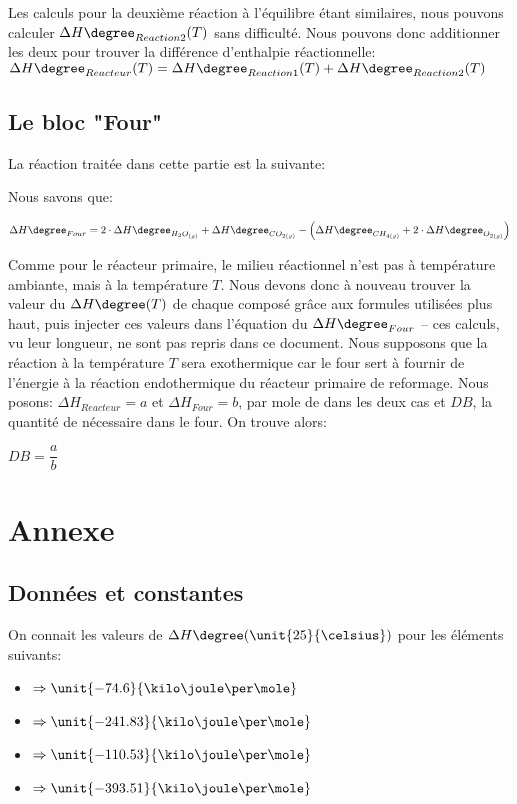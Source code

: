 \documentclass[11pt,a4paper]{report}
\begin{document}
Les calculs pour la deuxième réaction à l'équilibre étant similaires, nous pouvons
calculer $\Delta H\degree_{Reaction2}(T)$ sans difficulté. Nous pouvons donc additionner les deux pour trouver
la différence d'enthalpie réactionnelle: $\Delta H\degree_{Reacteur}(T)=\Delta H\degree_{Reaction1}(T)+\Delta H\degree_{Reaction2}(T)$

\subsection*{Le bloc "Four"}
La réaction traitée dans cette partie est la suivante:


Nous savons que:

$\Delta H\degree_{Four} = 2\cdot \Delta H\degree_{H_{2}O_{(g)}} + \Delta H\degree_{CO_{2(g)}}
- \left(\Delta H\degree_{CH_{4(g)}} + 2\cdot \Delta H\degree_{O_{2(g)}}\right)$

Comme pour le réacteur primaire, le milieu réactionnel n'est pas à température ambiante, mais à la température $T$. 
Nous devons donc à nouveau trouver la valeur du $\Delta H\degree(T)$ de chaque composé grâce aux formules utilisées plus haut,
puis injecter ces valeurs dans l'équation du $\Delta H\degree_{Four}$ -- ces calculs, vu leur longueur, ne sont pas repris dans
ce document.
Nous supposons que la réaction à la température $T$ sera exothermique car le four sert à fournir de l'énergie à la réaction
endothermique du réacteur primaire de reformage.
Nous posons: $\Delta H_{Reacteur} = a$ et $\Delta H_{Four} = b$, par mole de  dans les deux cas et $DB$, la quantité 
de  nécessaire dans le four.
On trouve alors:

$DB = \dfrac{a}{b}$



\section*{Annexe}
\subsection*{Données et constantes}
On connait les valeurs de $\Delta H\degree (\unit{25}{\celsius})$ pour les éléments suivants:

\begin{itemize}
\item{ $\Rightarrow \unit{-74.6}{\kilo\joule\per\mole}$}
\item{ $\Rightarrow \unit{-241.83}{\kilo\joule\per\mole}$}
\item{ $\Rightarrow \unit{-110.53}{\kilo\joule\per\mole}$}
\item{ $\Rightarrow \unit{-393.51}{\kilo\joule\per\mole}$}
\end{itemize}
\end{document}
